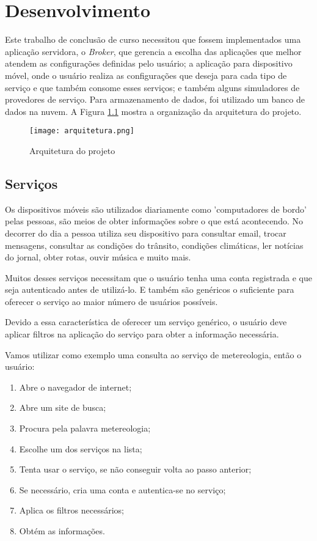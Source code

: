 \chapter{Desenvolvimento}\label{cha:desenvolvimento}
Este trabalho de conclusão de curso necessitou que fossem implementados uma aplicação servidora, o \textit{Broker}, que gerencia a escolha das aplicações que melhor atendem as configurações definidas pelo usuário; a aplicação para dispositivo móvel, onde o usuário realiza as configurações que deseja para cada tipo de serviço e que também consome esses serviços; e também alguns simuladores de provedores de serviço. Para armazenamento de dados, foi utilizado um banco de dados na nuvem. A Figura \ref{fig:arquitetura} mostra a organização da arquitetura do projeto.

\begin{figure}[!htb]
  \centering
  \texttt{[image: arquitetura.png]} %
  \caption[Arquitetura do projeto]{Arquitetura do projeto}
  \label{fig:arquitetura}
\end{figure}

\section{Serviços}
Os dispositivos móveis são utilizados diariamente como 'computadores de bordo' pelas pessoas, são meios de obter informações sobre o que está acontecendo. No decorrer do dia a pessoa utiliza seu dispositivo para consultar email, trocar mensagens, consultar as condições do trânsito, condições climáticas, ler notícias do jornal, obter rotas, ouvir música e muito mais.

Muitos desses serviços necessitam que o usuário tenha uma conta registrada e que seja autenticado antes de utilizá-lo. E também são genéricos o suficiente para oferecer o serviço ao maior número de usuários possíveis.

Devido a essa característica de oferecer um serviço genérico, o usuário deve aplicar filtros na aplicação do serviço para obter a informação necessária.

Vamos utilizar como exemplo uma consulta ao serviço de metereologia, então o usuário:
\begin{footnotesize}
  \begin{enumerate}
  \item Abre o navegador de internet;
  \item Abre um site de busca;
  \item Procura pela palavra metereologia;
  \item Escolhe um dos serviços na lista;
  \item Tenta usar o serviço, se não conseguir volta ao passo anterior;
  \item Se necessário, cria uma conta e autentica-se no serviço;
  \item Aplica os filtros necessários;
  \item Obtém as informações.
  \end{enumerate}
\end{footnotesize}

